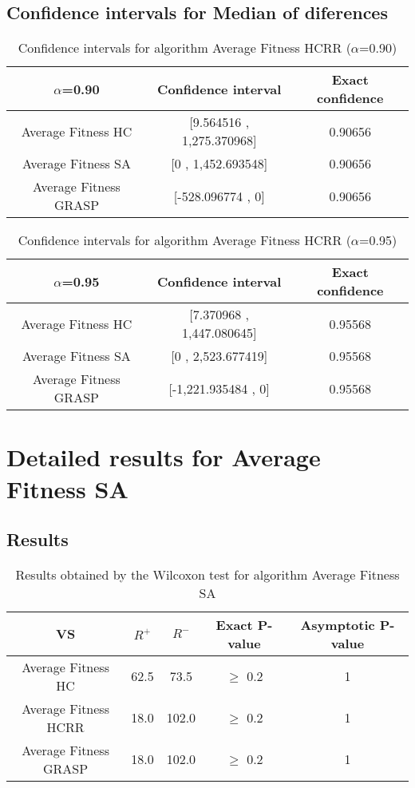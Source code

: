 \documentclass[a4paper,10pt]{article}
\begin{document}
\subsection{Confidence intervals for Median of diferences}

\begin{table}[!htp]
\centering\small
\begin{tabular}{
|c|c|c|}
\hline
 $\alpha$=0.90 & Confidence interval & Exact confidence \\ \hline 
Average Fitness HC       & [9.564516 , 1,275.370968] & 0.90656\\ \hline 
Average Fitness SA      & [0 , 1,452.693548] & 0.90656\\ \hline 
Average Fitness GRASP & [-528.096774 , 0] & 0.90656\\ \hline 

\end{tabular}
\caption{Confidence intervals for algorithm Average Fitness HCRR    ($\alpha$=0.90)}
\end{table}
\begin{table}[!htp]
\centering\small
\begin{tabular}{
|c|c|c|}
\hline
 $\alpha$=0.95 & Confidence interval & Exact confidence \\ \hline 
Average Fitness HC       & [7.370968 , 1,447.080645] & 0.95568\\ \hline 
Average Fitness SA      & [0 , 2,523.677419] & 0.95568\\ \hline 
Average Fitness GRASP & [-1,221.935484 , 0] & 0.95568\\ \hline 

\end{tabular}
\caption{Confidence intervals for algorithm Average Fitness HCRR    ($\alpha$=0.95)}
\end{table}

 \clearpage 


\section{Detailed results for Average Fitness SA     }


\subsection{Results}

\begin{table}[!htp]
\centering\small
\begin{tabular}{
|c|c|c|c|c|}
\hline
 VS & $R^{+}$ & $R^{-}$ & Exact P-value & Asymptotic P-value \\ \hline 
Average Fitness HC       & 62.5 & 73.5 & $\geq$ 0.2 & 1\\ \hline 
Average Fitness HCRR    & 18.0 & 102.0 & $\geq$ 0.2 & 1\\ \hline 
Average Fitness GRASP & 18.0 & 102.0 & $\geq$ 0.2 & 1\\ \hline 

\end{tabular}
\caption{Results obtained by the Wilcoxon test for algorithm Average Fitness SA     }
\end{table}
\end{document}
